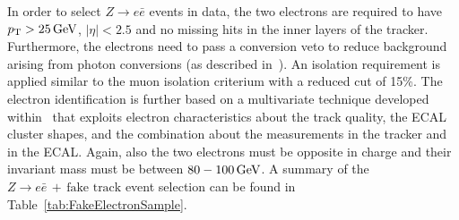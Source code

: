 In order to select $Z\rightarrow e\bar{e}$ events in data, the two electrons are required to have \mbox{$p_{\text{T}}>25\,\text{Ge}\kern-0.06667em\text{V}$}, $|\eta|<2.5$ and no missing hits in the inner layers of the tracker.
Furthermore, the electrons need to pass a conversion veto to reduce background arising from photon conversions (as described in~\cite{bib:CMS:ConversionVeto_PAS}).
An isolation requirement is applied similar to the muon isolation criterium with a reduced cut of 15\%.
The electron identification is further based on a multivariate technique developed within~\cite{bib:CMS:ElectronMVA} that exploits electron characteristics about the track quality, the ECAL cluster shapes, and the combination about the measurements in the tracker and in the ECAL.
Again, also the two electrons must be opposite in charge and their invariant mass must be between $80-100\,\text{Ge}\kern-0.06667em\text{V}$.
A summary of the $Z\rightarrow e\bar{e}\,+\,\text{fake track}$ event selection can be found in Table~\ref{tab:FakeElectronSample}.\\
\renewcommand{\arraystretch}{1.4}
